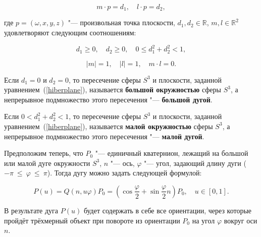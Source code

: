 \begin{equation}
m \cdot p=d_1, \quad l \cdot p=d_2,
\label{hiberplane}
\end{equation}

\noindent где $p=(\omega,x,y,z)$ "--- произвольная точка плоскости, $d_1,d_2 \in \mathbb{R}$, $m,l \in \mathbb{R}^2$
удовлетворяют следующим соотношениям:

$$
d_1 \ge 0, \quad d_2 \ge 0, \quad 0 \le d_1^2+d_2^2<1,
$$

$$
|m|=1, \quad |l|=1, \quad m \cdot l = 0.
$$

\begin{definition}
Если $d_1=0$ и $d_2=0$, то пересечение сферы $S^3$ и плоскости, заданной уравнением~(\ref{hiberplane}), называется
\textbf{большой окружностью} сферы $S^3$, а непрерывное подмножество этого пересечения "--- \textbf{большой дугой}.
\end{definition}

\begin{definition}
Если $0<d_1^2+d_2^2<1$, то пересечение сферы $S^3$ и плоскости, заданной уравнением~(\ref{hiberplane}), называется
\textbf{малой окружностью} сферы $S^3$, а непрерывное подмножество этого пересечения "--- \textbf{малой дугой}.
\end{definition}

Предположим теперь, что $P_0$ "--- единичный кватернион, лежащий на большой или малой дуге окружности $S^3$,
$n$ "--- ось, $\varphi$ "--- угол, задающий длину дуги ($-\pi~\le~\varphi~\le~\pi$). Тогда дугу можно задать следующей
формулой:

$$
P(u)=Q(n,u\varphi)P_0=(\cos\frac{\varphi}{2}+\sin\frac{\varphi}{2}n)P_0, \quad u \in [0,1].
$$

В результате дуга $P(u)$ будет содержать в себе все ориентации, через которые пройдёт трёхмерный объект при повороте
из ориентации $P_0$ на угол $\varphi$ вокруг оси $n$.

